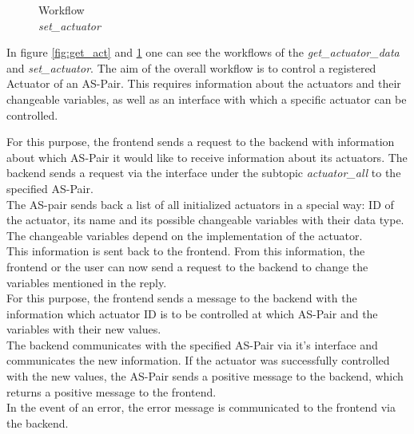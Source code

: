 \begin{figure}
\begin{minipage}[b]{0.39\textwidth}
         \caption{Workflow \\\textit{set\_actuator}}
         \label{fig:set_act}
     \end{minipage}
     \vspace{-.25\baselineskip}
\end{figure}


In figure \ref{fig:get_act} and \ref{fig:set_act} one can see the workflows of the \textit{get\_actuator\_data} and \textit{set\_actuator}. The aim of the overall workflow is to control a registered Actuator of an AS-Pair. This requires information about the actuators and their changeable variables, as well as an interface with which a specific actuator can be controlled.\\

\newpage

For this purpose, the frontend sends a request to the backend with information about which AS-Pair it would like to receive information about its actuators. The backend sends a request via the interface under the subtopic \textit{actuator\_all} to the specified AS-Pair.\\

The AS-pair sends back a list of all initialized actuators in a special way: ID of the actuator, its name and its possible changeable variables with their data type. The changeable variables depend on the implementation of the actuator. \\

This information is sent back to the frontend. From this information, the frontend or the user can now send a request to the backend to change the variables mentioned in the reply.\\

For this purpose, the frontend sends a message to the backend with the information which actuator ID is to be controlled at which AS-Pair and the variables with their new values.\\

The backend communicates with the specified AS-Pair via it's interface and communicates the new information. If the actuator was successfully controlled with the new values, the AS-Pair sends a positive message to the backend, which returns a positive message to the frontend. \\

In the event of an error, the error message is communicated to the frontend via the backend.

